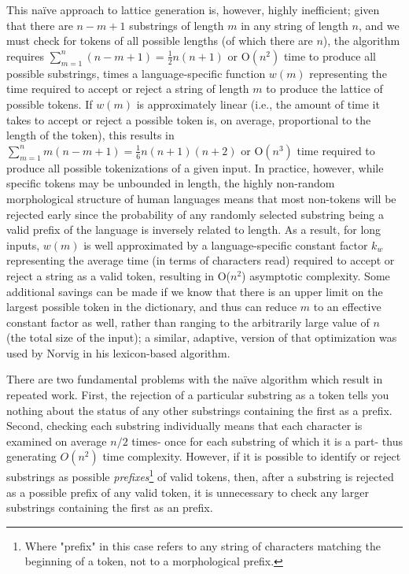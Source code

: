 This naïve approach to lattice generation is, however, highly inefficient; given that there are $n-m+1$ substrings of length $m$ in any string of length $n$, and we must check for tokens of all possible lengths (of which there are $n$), the algorithm requires $\sum_{m=1}^{n}(n-m+1)=\frac{1}{2}n(n+1)$ or O$(n^{2})$ time to produce all possible substrings, times a language-specific function $w(m)$ representing the time required to accept or reject a string of length $m$ to produce the lattice of possible tokens. If $w(m)$ is approximately linear (i.e., the amount of time it takes to accept or reject a possible token is, on average, proportional to the length of the token), this results in $\sum_{m=1}^{n}m(n-m+1)=\frac{1}{6}n(n+1)(n+2)$ or O$(n^{3})$ time required to produce all possible tokenizations of a given input. In practice, however, while specific tokens may be unbounded in length, the highly non-random morphological structure of human languages means that most non-tokens will be rejected early since the probability of any randomly selected substring being a valid prefix of the language is inversely related to length. As a result, for long inputs, $w(m)$ is well approximated by a language-specific constant factor $k_w$ representing the average time (in terms of characters read) required to accept or reject a string as a valid token, resulting in O($n^{2}$) asymptotic complexity. Some additional savings can be made if we know that there is an upper limit on the largest possible token in the dictionary, and thus can reduce $m$ to an effective constant factor as well, rather than ranging to the arbitrarily large value of $n$ (the total size of the input); a similar, adaptive, version of that optimization was used by Norvig in his lexicon-based algorithm\cite{norvig14}.

There are two fundamental problems with the naïve algorithm which result in repeated work. First, the rejection of a particular substring as a token tells you nothing about the status of any other substrings containing the first as a prefix. Second, checking each substring individually means that each character is examined on average $n/2$ times- once for each substring of which it is a part- thus generating $O(n^{2})$ time complexity. However, if it is possible to identify or reject substrings as possible \textit{prefixes}\footnote{Where "prefix" in this case refers to any string of characters matching the beginning of a token, not to a morphological prefix.} of valid tokens, then, after a substring is rejected as a possible prefix of any valid token, it is unnecessary to check any larger substrings containing the first as an prefix.

